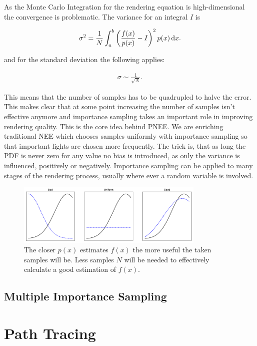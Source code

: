 As the Monte Carlo Integration for the rendering equation is high-dimensional the convergence is problematic. The variance for an integral $I$ is

\begin{align}
 \sigma^2 = \frac{1}{N} \int_a^b \left( \frac{f(x)}{p(x)} - I \right)^2 p(x) \mathop{}\!\mathrm{d} x.
\end{align}

and for the standard deviation the following applies:

\begin{align}
 \sigma \sim \frac{1}{\sqrt{N}}.
\end{align}

This means that the number of samples has to be quadrupled to halve the error. This makes clear that at some point increasing the number of samples isn't effective anymore and importance sampling takes an important role in improving rendering quality. This is the core idea behind PNEE. We are enriching traditional NEE which chooses samples uniformly with importance sampling so that important lights are chosen more frequently. The trick is, that as long the PDF is never zero for any value no bias is introduced, as only the variance is influenced, positively or negatively. Importance sampling can be applied to many stages of the rendering process, usually where ever a random variable is involved. 


\begin{figure}
    \centering
    \includegraphics[width=0.8\textwidth]{figures/plots/importancesampling.pdf}
    \caption{The closer $p(x)$ estimates $f(x)$ the more useful the taken samples will be. Less samples $N$ will be needed to effectively calculate a good estimation of $f(x)$.   }
    \label{fig:importancesample}
\end{figure}

\subsection{Multiple Importance Sampling}

\section{Path Tracing}
